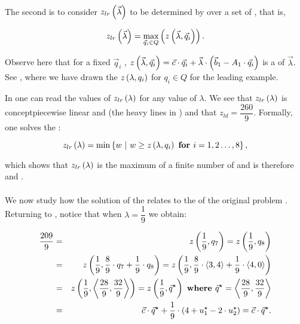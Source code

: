 \paragraph{}
The second  is to consider $z_{lr}\left( \vec{\lambda} \right)$ to be determined by  over a set of , that is,

\begin{equation}
z_{lr}\left( \vec{\lambda} \right)=\max_{\vec{q}_i\in Q}\left( z\left( \vec{\lambda},\vec{q}_i \right) \right).
\end{equation}

Observe here that for a fixed $\vec{q}_i$ , $z\left( \vec{\lambda},\vec{q}_i \right)=\vec{c}\cdot\vec{q}_i+\vec{\lambda}\cdot\left( \vec{b}_1-A_1\cdot\vec{q}_i \right)$ is a  of $\vec{\lambda}$. See , where we have drawn the  $z\left( \lambda,q_i \right)$ for $q_i\in Q$ for the leading example.



In  one can read the values of $z_{lr}\left( \lambda \right)$ for any value of $\lambda$. We see that $z_{lr}\left( \lambda \right)$ is concept{piecewise linear} and  (the heavy lines in ) and that $z_{ld}=\dfrac{260}{9}$. Formally, one solves the :

\begin{equation}
z_{lr}\left( \lambda \right)=\min\left\{ w\ |\ w\geq z\left( \lambda,q_i \right)\mbox{ \bf for } i=1,2\ldots,8 \right\},
\end{equation}

which shows that $z_{lr}\left( \lambda \right)$ is the maximum of a finite number of  and is therefore  and .

\paragraph{}
We now study how the solution of the  relates to the  of the original problem . Returning to , notice that when $\lambda=\dfrac{1}{9}$ we obtain:

\begin{eqnarray}
\dfrac{209}{9}&=&z\left( \dfrac{1}{9},q_7 \right)=z\left( \dfrac{1}{9},q_8 \right)\\
&=&z\left( \dfrac{1}{9},\dfrac{8}{9}\cdot q_7+\dfrac{1}{9}\cdot q_8 \right)=z\left( \dfrac{1}{9},\dfrac{8}{9}\cdot\left\langle 3,4 \right\rangle+\dfrac{1}{9}\cdot\left\langle 4,0 \right\rangle \right)\\
&=&z\left( \dfrac{1}{9},\left\langle \dfrac{28}{9},\dfrac{32}{9} \right\rangle \right)=z\left( \dfrac{1}{9},\vec{q}^{\star} \right)\mbox{ \bf where } \vec{q}^{\star}=\left\langle \dfrac{28}{9},\dfrac{32}{9} \right\rangle\\
&=&\vec{c}\cdot\vec{q}^{\star}+\dfrac{1}{9}\cdot\left( 4+u_1^{\star}-2\cdot u_2^{\star} \right)=\vec{c}\cdot\vec{q}^{\star}.
\end{eqnarray}

